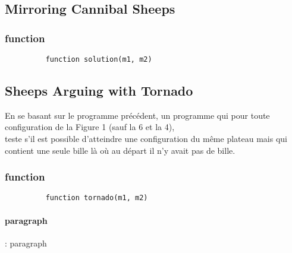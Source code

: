 \documentclass[utf8]{article}
\begin{document}
\subsection{ Mirroring Cannibal Sheeps }

\subsubsection{function}

\begin{figure}[H]
\begin{minipage}{\textwidth}
  \centering	
	\begin{lstlisting}
	function solution(m1, m2) 
    \end{lstlisting}
  \label{fig:code_exemple}
\end{minipage}
\end{figure}




\subsection{ Sheeps Arguing with Tornado }
En se basant sur le programme précédent, 
un programme qui pour toute configuration de la Figure 1 (sauf la 6 et la
4), \\
teste s’il est possible d’atteindre une configuration du même plateau
mais qui contient une seule bille là où au départ il n’y avait pas de bille.\\


\subsubsection{function}

\begin{figure}[H]
\begin{minipage}{\textwidth}
  \centering	
	\begin{lstlisting}
	function tornado(m1, m2) 
    \end{lstlisting}
  \label{fig:code_exemple}
\end{minipage}
\end{figure}

\paragraph{paragraph}:
    paragraph
    
  
\end{document}
